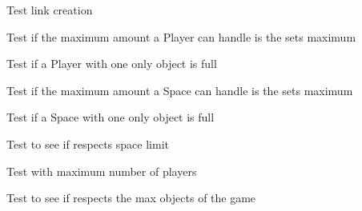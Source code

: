\begin{DoxyRefList}
\item[\label{test__test000126}%
\hypertarget{test__test000126}{}%
Member \hyperlink{link__test_8h_a159475c79eaec945c64ec6da610a89a0}{test4\+\_\+link\+\_\+create} ()]Test link creation  
\item[\label{test__test000194}%
\hypertarget{test__test000194}{}%
Member \hyperlink{player__test_8h_aa3a3053dd61cc8d45d019aa37e9f1379}{test4\+\_\+player\+\_\+get\+\_\+objects\+\_\+number} ()]Test if the maximum amount a Player can handle is the sets maximum  
\item[\label{test__test000208}%
\hypertarget{test__test000208}{}%
Member \hyperlink{player__test_8h_a96dcde9701d8318c454b634c13969503}{test4\+\_\+player\+\_\+is\+\_\+full} ()]Test if a Player with one only object is full  
\item[\label{test__test000252}%
\hypertarget{test__test000252}{}%
Member \hyperlink{space__test_8h_a8ce42751118666292a020b422fdf47d7}{test4\+\_\+space\+\_\+get\+\_\+objects\+\_\+number} ()]Test if the maximum amount a Space can handle is the sets maximum  
\item[\label{test__test000261}%
\hypertarget{test__test000261}{}%
Member \hyperlink{space__test_8h_a72720dff6c59a68817065ab4782c415a}{test4\+\_\+space\+\_\+is\+\_\+full} ()]Test if a Space with one only object is full  
\item[\label{test__test000051}%
\hypertarget{test__test000051}{}%
Member \hyperlink{game__test_8h_adeda95b2589eb0d71bf75fb8d567b51a}{test5\+\_\+game\+\_\+add\+\_\+object} ()]Test to see if respects space limit  
\item[\label{test__test000046}%
\hypertarget{test__test000046}{}%
Member \hyperlink{game__test_8h_a2a13a20e66d04d3d99812ad9b331a912}{test5\+\_\+game\+\_\+add\+\_\+player} ()]Test with maximum number of players  
\item[\label{test__test000052}%
\hypertarget{test__test000052}{}%
Member \hyperlink{game__test_8h_a6e0bfd68c1415964c3cd0e03bbcc1acb}{test6\+\_\+game\+\_\+add\+\_\+object} ()]Test to see if respects the max objects of the game 
\end{DoxyRefList}